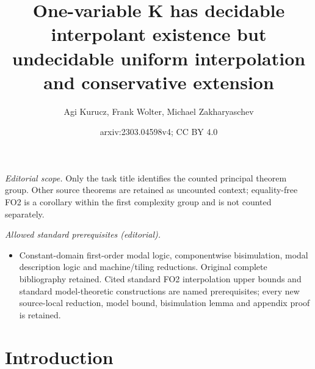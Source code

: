 \documentclass[10pt,a4paper]{amsart}
\title{One-variable K has decidable interpolant existence but undecidable uniform interpolation and conservative extension}
\author{Agi Kurucz, Frank Wolter, Michael Zakharyaschev}
\date{arxiv:2303.04598v4; CC BY 4.0}
\theoremstyle{plain}
\theoremstyle{definition}
\begin{document}
\maketitle
\noindent\textit{Editorial scope.} Only the task title identifies the counted principal theorem group. Other source theorems are retained as uncounted context; equality-free FO2 is a corollary within the first complexity group and is not counted separately.\par\medskip
\noindent\textit{Allowed standard prerequisites (editorial).}\begin{itemize}
\item Constant-domain first-order modal logic, componentwise bisimulation, modal description logic and machine/tiling reductions. Original complete bibliography retained. Cited standard FO2 interpolation upper bounds and standard model-theoretic constructions are named prerequisites; every new source-local reduction, model bound, bisimulation lemma and appendix proof is retained.
\end{itemize}\medskip
\section{Introduction}\label{intro}
\end{document}
